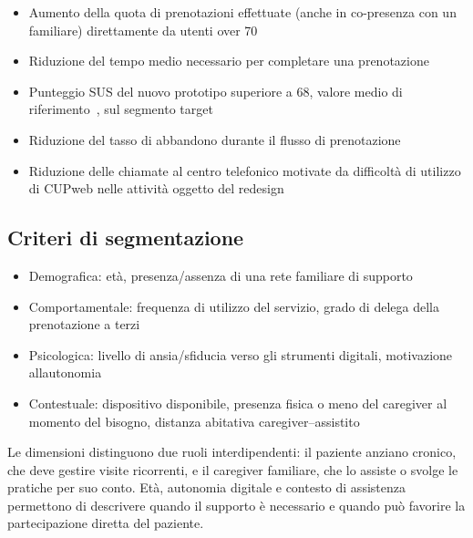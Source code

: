 \begin{itemize}
\item
  Aumento della quota di prenotazioni effettuate (anche in co-presenza
  con un familiare) direttamente da utenti over 70
\item
  Riduzione del tempo medio necessario per completare una prenotazione
\item
  Punteggio SUS del nuovo prototipo superiore a 68, valore medio di
  riferimento~\cite{sauroSUS2011}, sul segmento target
\item
  Riduzione del tasso di abbandono durante il flusso di prenotazione
\item
  Riduzione delle chiamate al centro telefonico motivate da difficoltà di
  utilizzo di CUPweb nelle attività oggetto del redesign
\end{itemize}

\label{doc:a:03}

\subsection{Criteri di segmentazione}


\begin{itemize}
\item
  Demografica: età, presenza/assenza di una rete familiare di supporto
\item
  Comportamentale: frequenza di utilizzo del servizio, grado di delega
  della prenotazione a terzi
\item
  Psicologica: livello di ansia/sfiducia verso gli strumenti digitali,
  motivazione all\textquotesingle autonomia
\item
  Contestuale: dispositivo disponibile, presenza fisica o meno del
  caregiver al momento del bisogno, distanza abitativa
  caregiver--assistito
\end{itemize}


Le dimensioni distinguono due ruoli interdipendenti: il paziente anziano
cronico, che deve gestire visite ricorrenti, e il caregiver familiare, che
lo assiste o svolge le pratiche per suo conto. Età, autonomia digitale e
contesto di assistenza permettono di descrivere quando il supporto è
necessario e quando può favorire la partecipazione diretta del paziente.

